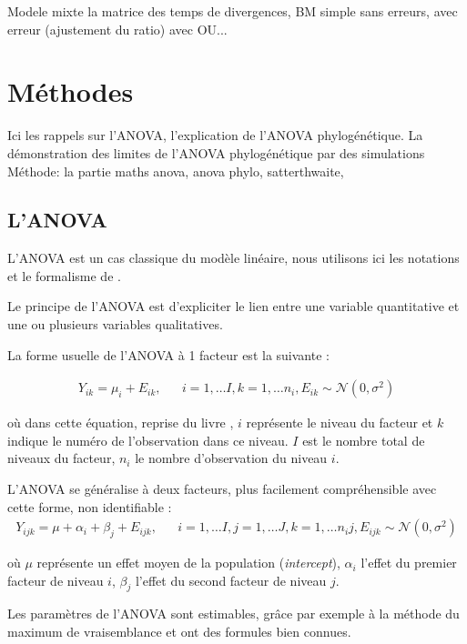 \documentclass[a4paper, 12pt]{article}\usepackage[]{graphicx}\usepackage[]{xcolor}
\newcommand{\Normal}{\mathcal{N}}
\begin{document}
Modele mixte la matrice des temps de divergences, BM simple sans erreurs, avec erreur (ajustement du ratio) avec OU...

\section{Méthodes}
\label{sec:methode}
Ici les rappels sur l'ANOVA, l'explication de l'ANOVA phylogénétique. La démonstration des limites de l'ANOVA phylogénétique par des simulations
Méthode: la partie maths anova, anova phylo, satterthwaite, 

\subsection{L'ANOVA}

L'ANOVA est un cas classique du modèle linéaire, nous utilisons ici les notations et le formalisme de \cite{belModeleLineaireSes}.

Le principe de l'ANOVA est d'expliciter le lien entre une variable quantitative et une ou plusieurs variables qualitatives.

La forme usuelle de l'ANOVA à 1 facteur est la suivante :

\begin{align}
Y_{ik} = \mu_i + E_{ik}, & &i = 1,\dots I, k = 1,\dots n_i, E_{ik} \sim \Normal (0, \sigma^2)
\end{align}

où dans cette équation, reprise du livre \parencite{belModeleLineaireSes}, $i$ représente le niveau du facteur et $k$ indique le numéro de l'observation dans ce niveau. $I$ est le nombre total de niveaux du facteur, $n_i$ le nombre d'observation du niveau $i$. 

L'ANOVA se généralise à deux facteurs, plus facilement compréhensible avec cette forme, non identifiable :
\begin{align}
Y_{ijk} = \mu + \alpha_i + \beta_j + E_{ijk}, & &i = 1,\dots I, j = 1,\dots J, k = 1,\dots n_ij, E_{ijk} \sim \Normal (0, \sigma^2)
\end{align}

où $\mu$ représente un effet moyen de la population (\emph{intercept}), $\alpha_i$ l'effet du premier facteur de niveau $i$, $\beta_j$ l'effet du second facteur de niveau $j$.

Les paramètres de l'ANOVA sont estimables, grâce par exemple à la méthode du maximum de vraisemblance et ont des formules bien connues.
\end{document}
